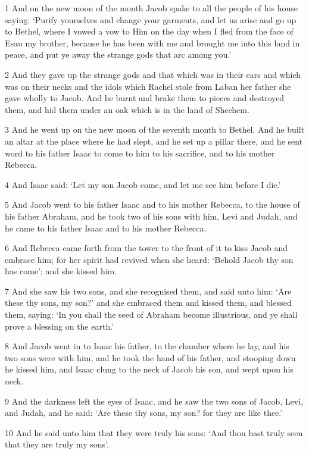 \par 1 And on the new moon of the month Jacob spake to all the people of his house saying: ‘Purify yourselves and change your garments, and let us arise and go up to Bethel, where I vowed a vow to Him on the day when I fled from the face of Esau my brother, because he has been with me and brought me into this land in peace, and put ye away the strange gods that arc among you.’
\par 2 And they gave up the strange gods and that which was in their ears and which was on their necks and the idols which Rachel stole from Laban her father she gave wholly to Jacob. And he burnt and brake them to pieces and destroyed them, and hid them under an oak which is in the land of Shechem.
\par 3 And he went up on the new moon of the seventh month to Bethel. And he built an altar at the place where he had slept, and he set up a pillar there, and he sent word to his father Isaac to come to him to his sacrifice, and to his mother Rebecca.
\par 4 And Isaac said: ‘Let my son Jacob come, and let me see him before I die.’
\par 5 And Jacob went to his father Isaac and to his mother Rebecca, to the house of his father Abraham, and he took two of his sons with him, Levi and Judah, and he came to his father Isaac and to his mother Rebecca.
\par 6 And Rebecca came forth from the tower to the front of it to kiss Jacob and embrace him; for her spirit had revived when she heard: ‘Behold Jacob thy son has come’; and she kissed him.
\par 7 And she saw his two sons, and she recognised them, and said unto him: ‘Are these thy sons, my son?’ and she embraced them and kissed them, and blessed them, saying: ‘In you shall the seed of Abraham become illustrious, and ye shall prove a blessing on the earth.’
\par 8 And Jacob went in to Isaac his father, to the chamber where he lay, and his two sons were with him, and he took the hand of his father, and stooping down he kissed him, and Isaac clung to the neck of Jacob his son, and wept upon his neck.
\par 9 And the darkness left the eyes of Isaac, and he saw the two sons of Jacob, Levi, and Judah, and he said: ‘Are these thy sons, my son? for they are like thee.’
\par 10 And he said unto him that they were truly his sons: ‘And thou hast truly seen that they are truly my sons’.
